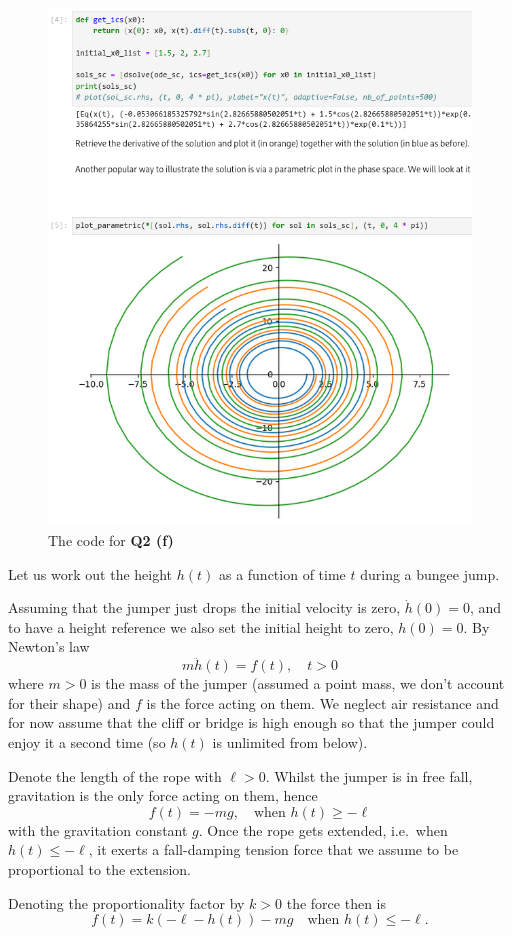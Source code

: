 \documentclass[a4paper]{article}
\begin{document}
\begin{figure}[hbtp]
    \centering
    \includegraphics[width=\linewidth]{Q2-f}
    \caption{The code for \textbf{Q2 (f)}}
\end{figure}



\begin{questionbody}
Let us work out the height $h(t)$ as a function of time $t$ during a bungee jump.

Assuming that the jumper just drops the initial velocity is zero, $\dot h(0) = 0$, and to have a height reference we also set the initial height to zero, $h(0) = 0$. By Newton’s law \[
m \ddot h(t) = f(t), \quad t > 0
\] where $m > 0$ is the mass of the jumper (assumed a point mass, we don’t account for their shape) and $f$ is the force acting on them. We neglect air resistance and for now assume that the cliff or bridge is high enough so that the jumper could enjoy it a second time (so $h(t)$ is unlimited from below).

Denote the length of the rope with $\ell > 0$. Whilst the jumper is in free fall, gravitation is the only force acting on them, hence \[
f(t) = -mg, \quad \text{when } h(t) \ge -\ell
\] with the gravitation constant $g$. Once the rope gets extended, i.e.\ when $h(t) \le -\ell$, it exerts a fall-damping tension force that we assume to be proportional to the extension.

Denoting the proportionality factor by $k > 0$ the force then is \[
f(t) = k(-\ell - h(t)) - mg \quad \text{when } h(t) \le -\ell.
\]
\end{questionbody}
\end{document}
